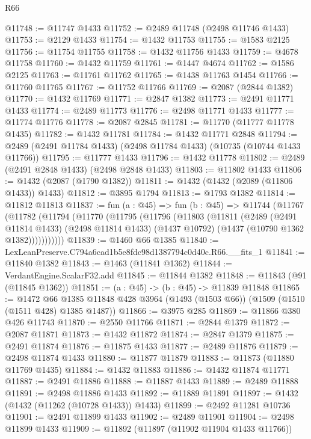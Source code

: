 \begin{lexlean}{R66}
\begin{coremodule}
@11748 := @11747 @1433
@11752 := @2489 @11748 (@2498 @11746 @1433)
@11753 := @2129 @1433
@11754 := @1432 @11753
@11755 := @1583 @2125
@11756 := @11754 @11755
@11758 := @1432 @11756 @1433
@11759 := @4678 @11758
@11760 := @1432 @11759
@11761 := @1447 @4674
@11762 := @1586 @2125
@11763 := @11761 @11762
@11765 := @1438 @11763 @1454
@11766 := @11760 @11765
@11767 := @11752 @11766
@11769 := @2087 (@2844 @1382)
@11770 := @1432 @11769
@11771 := @2847 @1382
@11773 := @2491 @11771 @1433
@11774 := @2489 @11773
@11776 := @2498 @11771 @1433
@11777 := @11774 @11776
@11778 := @2087 @2845
@11781 := @11770 (@11777 @11778 @1435)
@11782 := @1432 @11781
@11784 := @1432 @11771 @2848
@11794 := @2489 (@2491 @11784 @1433) (@2498 @11784 @1433) (@10735 (@10744 @1433 @11766))
@11795 := @11777 @1433
@11796 := @1432 @11778
@11802 := @2489 (@2491 @2848 @1433) (@2498 @2848 @1433)
@11803 := @11802 @1433
@11806 := @1432 (@2087 (@1790 @1382))
@11811 := @1432 (@1432 (@2089 (@11806 @1433)) @1433)
@11812 := @3895 @1794
@11813 := @1793 @1382
@11814 := @11812 @11813
@11837 := fun (a : @45) =>
  fun (b : @45) =>
  @11744
    (@11767
      (@11782
        (@11794
          (@11770
            (@11795
              (@11796
                (@11803
                  (@11811
                    (@2489
                      (@2491 @11814 @1433)
                      (@2498 @11814 @1433)
                      (@1437 @10792)
                      (@1437 (@10790 @1362 @1382)))))))))))
@11839 := @1460 @66 @1385
@11840 := LexLeanPreserve.C794a6cad1b5e8fdc98d1387794c0d40c.R66.__fits_1
@11841 := @11840 @1382
@11843 := @1463 (@11841 @1362)
@11844 := VerdantEngine.ScalarF32.add
@11845 := @11844 @1382
@11848 := @11843 (@91 (@11845 @1362))
@11851 := (a : @45) -> (b : @45) -> @11839 @11848
@11865 := @1472
    @66
    @1385
    @11848
    @428
    @3964
    (@1493 (@1503 @66))
    (@1509 (@1510 (@1511 @428) @1385 @1487))
@11866 := @3975 @285
@11869 := @11866 @380 @426 @11743
@11870 := @2550 @11766
@11871 := @2844 @1379
@11872 := @2087 @11871
@11873 := @1432 @11872
@11874 := @2847 @1379
@11875 := @2491 @11874
@11876 := @11875 @1433
@11877 := @2489 @11876
@11879 := @2498 @11874 @1433
@11880 := @11877 @11879
@11883 := @11873 (@11880 @11769 @1435)
@11884 := @1432 @11883
@11886 := @1432 @11874 @11771
@11887 := @2491 @11886
@11888 := @11887 @1433
@11889 := @2489 @11888
@11891 := @2498 @11886 @1433
@11892 := @11889 @11891
@11897 := @1432 (@1432 (@11262 (@10728 @1433)) @1433)
@11899 := @2492 @11281 @10736
@11901 := @2491 @11899 @1433
@11902 := @2489 @11901
@11904 := @2498 @11899 @1433
@11909 := @11892 (@11897 (@11902 @11904 @1433 @11766))

\end{coremodule}
\end{lexlean}
